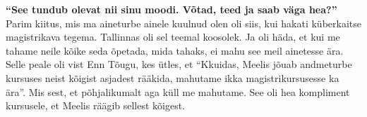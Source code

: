 \textbf{\enquote{See tundub olevat nii sinu moodi. Võtad, teed ja saab väga hea?}}
Parim kiitus, mis ma aineturbe ainele kuulnud olen oli siis, kui hakati küberkaitse magistrikava tegema. Tallinnas oli sel teemal koosolek. Ja oli häda, et kui me tahame neile kõike seda õpetada, mida tahaks, ei mahu see meil ainetesse ära. Selle peale oli vist Enn Tõugu, kes ütles, et \enquote{Kkuidas, Meelis jõuab andmeturbe kursuses neist kõigist asjadest rääkida,  mahutame ikka magistrikursusesse ka ära}. Mis sest, et põhjalikumalt aga küll me mahutame. See oli hea kompliment kursusele, et Meelis räägib sellest kõigest. 


